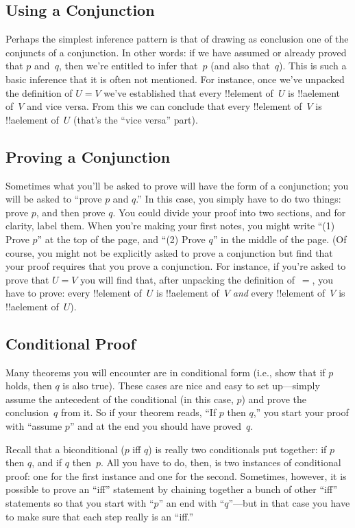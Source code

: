 \documentclass[../../../include/open-logic-section]{subfiles}
\begin{document}
\subsection{Using a Conjunction}

Perhaps the simplest inference pattern is that of drawing as
conclusion one of the conjuncts of a conjunction. In other words: if
we have assumed or already proved that $p$ and~$q$, then we're
entitled to infer that~$p$ (and also that~$q$).  This is such a basic
inference that it is often not mentioned.  For instance, once we've
unpacked the definition of $U = V$ we've established that every
!!{element} of~$U$ is !!a{element} of~$V$ and vice versa. From this
we can conclude that every !!{element} of~$V$ is !!a{element} of~$U$
(that's the ``vice versa'' part).  

\subsection{Proving a Conjunction}

Sometimes what you'll be asked to prove will have the form of a
conjunction; you will be asked to ``prove $p$ and $q$.'' In this case,
you simply have to do two things: prove $p$, and then prove $q$. You
could divide your proof into two sections, and for clarity, label
them. When you're making your first notes, you might write ``(1) Prove
$p$'' at the top of the page, and ``(2) Prove $q$'' in the middle of
the page. (Of course, you might not be explicitly asked to prove a
conjunction but find that your proof requires that you prove a
conjunction. For instance, if you're asked to prove that $U = V$ you
will find that, after unpacking the definition of~$=$, you have to
prove: every !!{element} of~$U$ is !!a{element} of~$V$
\emph{and} every !!{element} of~$V$ is !!a{element} of~$U$).

\subsection{Conditional Proof}

Many theorems you will encounter are in conditional form (i.e., show
that if $p$ holds, then $q$ is also true). These cases are nice and
easy to set up---simply assume the antecedent of the conditional (in
this case, $p$) and prove the conclusion~$q$ from it.  So if your
theorem reads, ``If $p$ then $q$,'' you start your proof with ``assume
$p$'' and at the end you should have proved~$q$.

Recall that a biconditional ($p$ iff $q$) is really two conditionals
put together: if $p$ then $q$, and if $q$ then~$p$. All you have to
do, then, is two instances of conditional proof: one for the first
instance and one for the second. Sometimes, however, it is possible to
prove an ``iff'' statement by chaining together a bunch of other
``iff'' statements so that you start with ``$p$'' an end with
``$q$''---but in that case you have to make sure that each step really
is an ``iff.''
\end{document}
